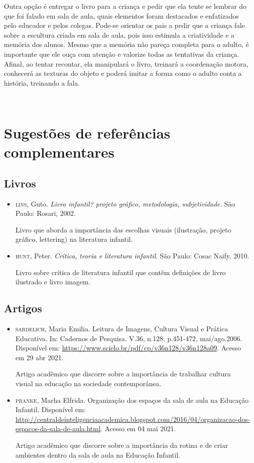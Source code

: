 \documentclass[11pt]{extarticle}
\begin{document}
\begin{enumerate}
Outra opção é entregar o livro para a criança e pedir que ela tente se lembrar
do que foi falado em sala de aula, quais elementos foram destacados e enfatizados pelo educador e pelos colegas. Pode-se orientar os pais a pedir que a criança fale sobre a escultura criada em sala de aula, pois isso estimula a criatividade e a memória dos alunos. Mesmo que a memória não pareça 
completa para o adulto, é importante que ele ouça com atenção e 
valorize todas as tentativas da criança. Afinal, ao tentar recontar, 
ela manipulará o livro, treinará a coordenação motora, conhecerá as texturas 
do objeto e poderá imitar a forma como o adulto 
conta a história, treinando a fala. 
\end{enumerate}

 
\section{Sugestões de referências complementares}

\subsection{Livros} 

\begin{itemize}
\item \textsc{lins}, Guto. \textit{Livro infantil? projeto gráfico, metodologia, subjetividade}. São Paulo: Rosari, 2002.

Livro que aborda a importância das escolhas visuais (ilustração, projeto gráfico, lettering) na literatura infantil.  

\item \textsc{hunt}, Peter. \textit{Crítica, teoria e literatura infantil}. São Paulo: Cosac Naify, 2010.

Livro sobre crítica de literatura infantil que contêm definições de livro ilustrado e livro imagem. 
\end{itemize}

\subsection{Artigos}

\begin{itemize}
\item \textsc{sardelich}, Maria Emilia. Leitura de Imagens, Cultura Visual e Prática Educativa. 
In: Cadernos de Pesquisa. V.36, n.128, p.451-472, mai/ago.2006. Disponível em: \url{https://www.scielo.br/pdf/cp/v36n128/v36n128a09}. 
Acesso em 29 abr 2021. 

Artigo acadêmico que discorre sobre a importância de trabalhar cultura 
visual na educação na sociedade contemporânea. 

\item \textsc{pranke}, Marha Elfrida. Organização dos espaços da sala de aula na Educação Infantil. Disponível em: \url{http://centraldeinteligenciaacademica.blogspot.com/2016/04/organizacao-dos-espacos-da-sala-de-aula.html}. Acesso em 04 mai 2021. 

Artigo acadêmico que discorre sobre a importância da rotina e de criar ambientes dentro da sala de aula na Educação Infantil.  
\end{itemize}
\end{document}
